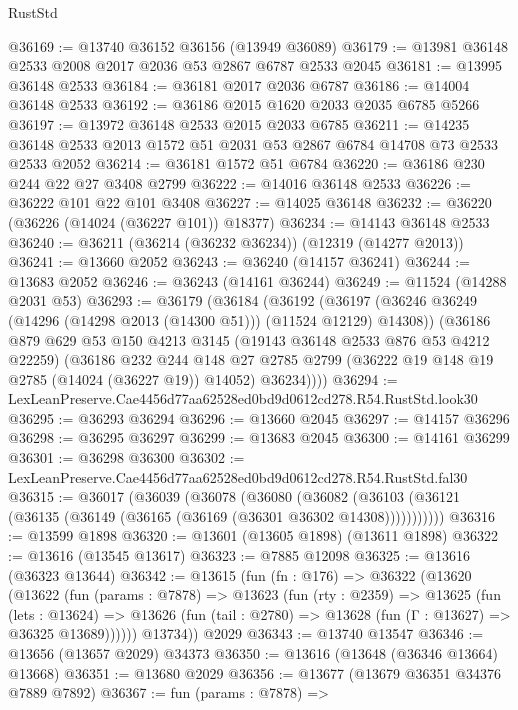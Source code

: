 \begin{lexlean}{RustStd}
\begin{coremodule}
@36169 := @13740 @36152 @36156 (@13949 @36089)
@36179 := @13981 @36148 @2533 @2008 @2017 @2036 @53 @2867 @6787 @2533 @2045
@36181 := @13995 @36148 @2533
@36184 := @36181 @2017 @2036 @6787
@36186 := @14004 @36148 @2533
@36192 := @36186 @2015 @1620 @2033 @2035 @6785 @5266
@36197 := @13972 @36148 @2533 @2015 @2033 @6785
@36211 := @14235 @36148 @2533 @2013 @1572 @51 @2031 @53 @2867 @6784 @14708 @73 @2533 @2533 @2052
@36214 := @36181 @1572 @51 @6784
@36220 := @36186 @230 @244 @22 @27 @3408 @2799
@36222 := @14016 @36148 @2533
@36226 := @36222 @101 @22 @101 @3408
@36227 := @14025 @36148
@36232 := @36220 (@36226 (@14024 (@36227 @101)) @18377)
@36234 := @14143 @36148 @2533
@36240 := @36211 (@36214 (@36232 @36234)) (@12319 (@14277 @2013))
@36241 := @13660 @2052
@36243 := @36240 (@14157 @36241)
@36244 := @13683 @2052
@36246 := @36243 (@14161 @36244)
@36249 := @11524 (@14288 @2031 @53)
@36293 := @36179
    (@36184
      (@36192
        (@36197 (@36246 @36249 (@14296 (@14298 @2013 (@14300 @51))) (@11524 @12129) @14308))
        (@36186
          @879
          @629
          @53
          @150
          @4213
          @3145
          (@19143 @36148 @2533 @876 @53 @4212 @22259)
          (@36186
            @232
            @244
            @148
            @27
            @2785
            @2799
            (@36222 @19 @148 @19 @2785 (@14024 (@36227 @19)) @14052)
            @36234))))
@36294 := LexLeanPreserve.Cae4456d77aa62528ed0bd9d0612cd278.R54.RustStd.look30
@36295 := @36293 @36294
@36296 := @13660 @2045
@36297 := @14157 @36296
@36298 := @36295 @36297
@36299 := @13683 @2045
@36300 := @14161 @36299
@36301 := @36298 @36300
@36302 := LexLeanPreserve.Cae4456d77aa62528ed0bd9d0612cd278.R54.RustStd.fal30
@36315 := @36017
    (@36039
      (@36078
        (@36080
          (@36082 (@36103 (@36121 (@36135 (@36149 (@36165 (@36169 (@36301 @36302 @14308)))))))))))
@36316 := @13599 @1898
@36320 := @13601 (@13605 @1898) (@13611 @1898)
@36322 := @13616 (@13545 @13617)
@36323 := @7885 @12098
@36325 := @13616 (@36323 @13644)
@36342 := @13615
    (fun (fn : @176) =>
    @36322
      (@13620
        (@13622
          (fun (params : @7878) =>
          @13623
            (fun (rty : @2359) =>
            @13625
              (fun (lets : @13624) =>
              @13626 (fun (tail : @2780) => @13628 (fun (Γ : @13627) => @36325 @13689))))))
        @13734))
    @2029
@36343 := @13740 @13547
@36346 := @13656 (@13657 @2029) @34373
@36350 := @13616 (@13648 (@36346 @13664) @13668)
@36351 := @13680 @2029
@36356 := @13677 (@13679 @36351 @34376 @7889 @7892)
@36367 := fun (params : @7878) =>

\end{coremodule}
\end{lexlean}
